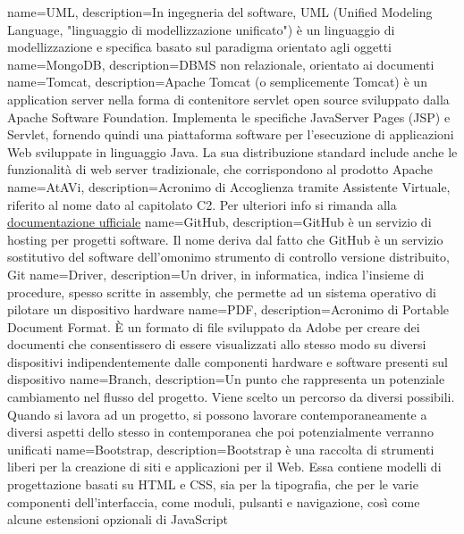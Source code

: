  {
	name=UML,
	description={In ingegneria del software, UML (Unified Modeling Language, "linguaggio di modellizzazione unificato") è un linguaggio di modellizzazione e specifica basato sul paradigma orientato agli oggetti}
}
 {
	name=MongoDB,
	description={DBMS non relazionale, orientato ai documenti}
}
 {
	name=Tomcat,
	description={Apache Tomcat (o semplicemente Tomcat) è un application server nella forma di contenitore servlet open source sviluppato dalla Apache Software Foundation. Implementa le specifiche JavaServer Pages (JSP) e Servlet, fornendo quindi una piattaforma software per l'esecuzione di applicazioni Web sviluppate in linguaggio Java. La sua distribuzione standard include anche le funzionalità di web server tradizionale, che corrispondono al prodotto Apache}
}
 {
	name=AtAVi,
	description={Acronimo di Accoglienza tramite Assistente Virtuale, riferito al nome dato al capitolato C2. Per ulteriori info si rimanda alla \href{http://www.math.unipd.it/~tullio/IS-1/2016/Progetto/C2.pdf}{documentazione ufficiale}}
}
 {
	name=GitHub,
	description={GitHub è un servizio di hosting per progetti software. Il nome deriva dal fatto che GitHub è un servizio sostitutivo del software dell'omonimo strumento di controllo versione distribuito, Git}
}
 {
	name=Driver,
	description={Un driver, in informatica, indica l'insieme di procedure, spesso scritte in assembly, che permette ad un sistema operativo di pilotare un dispositivo hardware}
}
 {
	name=PDF,
	description={Acronimo di Portable Document Format. È un formato di file sviluppato da Adobe per creare dei documenti che consentissero di essere visualizzati allo stesso modo su diversi dispositivi indipendentemente dalle componenti hardware e software presenti sul dispositivo}
}
 {
	name=Branch,
	description={Un punto che rappresenta un potenziale cambiamento nel flusso del progetto. Viene scelto un percorso da diversi possibili. Quando si lavora ad un progetto, si possono lavorare contemporaneamente a diversi aspetti dello stesso in contemporanea che poi potenzialmente verranno unificati}
}
 {
	name=Bootstrap,
	description={Bootstrap è una raccolta di strumenti liberi per la creazione di siti e applicazioni per il Web. Essa contiene modelli di progettazione basati su HTML e CSS, sia per la tipografia, che per le varie componenti dell'interfaccia, come moduli, pulsanti e navigazione, così come alcune estensioni opzionali di JavaScript}
}
